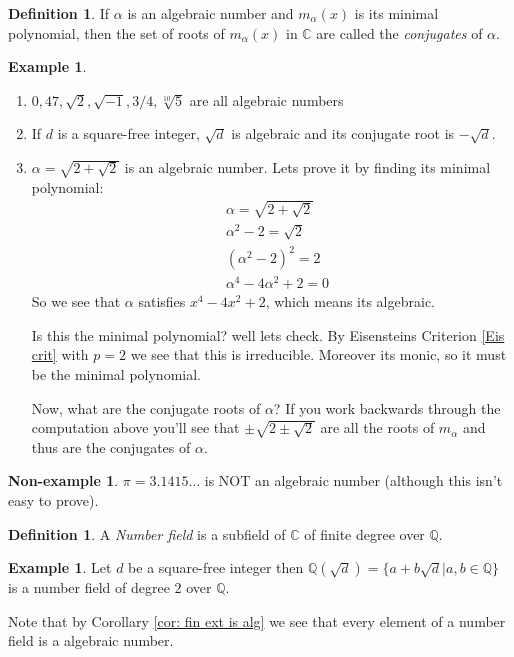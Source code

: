\documentclass[11pt,a4paper]{report}
\theoremstyle{plain}
\theoremstyle{definition}
\newtheorem{definition}[subsection]{Definition}
\newtheorem{exmp}[subsection]{Example}
\newtheorem{nexmp}[subsection]{Non-example}
\theoremstyle{definition}
\def\CC{\mathbb{C}}
\def\QQ{\mathbb{Q}}
\def \a{\alpha}
\begin{document}
	\begin{definition}
		If $\a$ is an algebraic number and $m_\a(x)$ is its minimal polynomial, then the set of roots of $m_\a(x)$ in $\CC$ are called the \textit{conjugates} of $\a$.
	\end{definition}
	
	
	
	
	\begin{exmp}
		\begin{enumerate}
			\item $0,47,\sqrt{2},\sqrt{-1},3/4, \sqrt[10]{5}$ are all algebraic numbers
			\item If $d$ is a square-free integer, $\sqrt{d}$ is algebraic and its conjugate root is $-\sqrt{d}$. 
			
			\item $\a=\sqrt{2+\sqrt{2}}$ is an algebraic number. Lets prove it by finding its minimal polynomial:	
			\begin{align}
				&\a=\sqrt{2+\sqrt{2}}\\
				&\a^2-2= \sqrt{2}\\
				&(\a^2-2)^2=2\\
				&\a^4-4\a^2+2=0
			\end{align}
			So we see that $\a$ satisfies $x^4-4x^2+2$, which means its algebraic. 
			
			Is this the minimal polynomial? well lets check. By Eisensteins Criterion \ref{Eis crit} with $p=2$ we see that this is irreducible. Moreover its monic, so it must be the minimal polynomial.
			
			Now, what are the conjugate roots of $\a$? If you work backwards through the computation above you'll see that $\pm \sqrt{2 \pm \sqrt{2}}$ are all the roots of $m_\a$ and thus are the conjugates of $\a$.
		\end{enumerate}
		
		
	\end{exmp}
	
	\begin{nexmp}
		$\pi=3.1415\dots$ is NOT an algebraic number (although this isn't easy to prove).
	\end{nexmp}
	
	\begin{definition}
		A \textit{Number field} is a subfield of $\CC$ of finite degree over $\QQ$.
	\end{definition}	
	
	\begin{exmp}
		Let $d$ be a square-free integer then $\QQ(\sqrt{d})=\{a+b\sqrt{d}| a,b \in \QQ\}$ is a number field of degree $2$ over $\QQ$. 
	\end{exmp}
	Note that by Corollary \ref{cor: fin ext is alg} we see that every element of a number field is a algebraic number.
	
\end{document}
